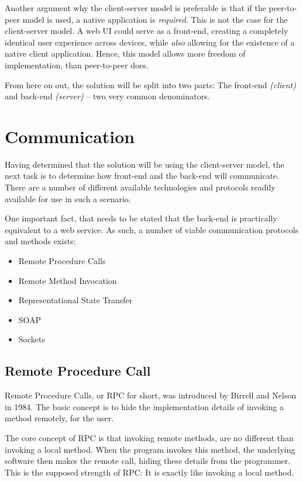 			Another argument why the client-server model is preferable is that if the peer-to-peer model is used, a native application is \emph{required}. This is not the case for the client-server model. A web UI could serve as a front-end, creating a completely identical user experience across devices, while \emph{also} allowing for the existence of a native client application. Hence, this model allows more freedom of implementation, than peer-to-peer does.

			From here on out, the solution will be split into two parts: The front-end \emph{(client)} and back-end \emph{(server)} -- two very common denominators.

	\section{Communication}
		\label{sec:comms}
		Having determined that the solution will be using the client-server model, the next task is to determine how front-end and the back-end will communicate. There are a number of different available technologies and protocols readily available for use in such a scenario.

		One important fact, that needs to be stated that the back-end is practically equivalent to a web service. As such, a number of viable communication protocols and methods exists:

		\begin{itemize}
			\item Remote Procedure Calls
			\item Remote Method Invocation
			\item Representational State Transfer
			\item SOAP	
			\item Sockets
		\end{itemize}

		\subsection{Remote Procedure Call}
			Remote Procedure Calls, or RPC for short, was introduced by Birrell and Nelson \cite{birell1984} in 1984. The basic concept is to hide the implementation details of invoking a method remotely, for the user.

			The core concept of RPC is that invoking remote methods, are no different than invoking a local method. When the program invokes this method, the underlying software then makes the remote call, hiding these details from the programmer. This is the supposed strength of RPC: It is exactly like invoking a local method.

